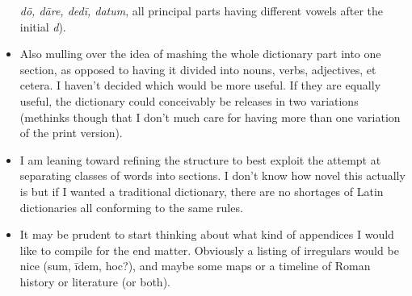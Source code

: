 \begin{itemize}
    \textit{d\=o, d\=are, ded\=i, datum}, all principal parts
    having different vowels after the initial \textit{d}).
  \item Also mulling over the idea of mashing the whole
    dictionary part into one section, as opposed to having
    it divided into nouns, verbs, adjectives, et cetera.
    I haven't decided which would be more useful.  If they
    are equally useful, the dictionary could conceivably
    be releases in two variations (methinks though that I
    don't much care for having more than one variation of
    the print version).
  \item I am leaning toward refining the structure to best
    exploit the attempt at separating classes of words into
    sections.  I don't know how novel this actually is but
    if I wanted a traditional dictionary, there are no
    shortages of Latin dictionaries all conforming to the
    same rules.
  \item It may be prudent to start thinking about what kind
    of appendices I would like to compile for the end
    matter.  Obviously a listing of irregulars would be
    nice (sum, \=idem, hoc?), and maybe some maps or a
    timeline of Roman history or literature (or both).
\end{itemize}
